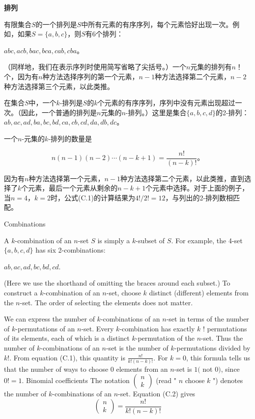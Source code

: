 \documentclass[lang=cn,newtx,10pt,scheme=chinese]{elegantbook}
\begin{document}
\textbf{排列}

有限集合$S$的一个排列是$S$中所有元素的有序序列，每个元素恰好出现一次。例如，如果$S=\{a,b,c\}$，则$S$有6个排列：

$a b c, a c b, b a c, b c a, c a b, c b a$。

（同样地，我们在表示序列时使用简写省略了尖括号。）一个$n$元集的排列有$n$！个，因为有$n$种方法选择序列的第一个元素，$n-1$种方法选择第二个元素，$n-2$种方法选择第三个元素，以此类推。

在集合$S$中，一个$k$-排列是$S$的$k$个元素的有序序列，序列中没有元素出现超过一次。（因此，一个普通的排列是$n$元集的$n$-排列。）这里是集合$\{a,b,c,d\}$的2-排列：$a b, a c, a d, b a, b c, b d, c a, c b, c d, d a, d b, d c$。

一个$n$-元集的$k$-排列的数量是

$$
n(n-1)(n-2) \cdots(n-k+1)=\frac{n !}{(n-k) !} \text {。}
$$

因为有$n$种方法选择第一个元素，$n-1$种方法选择第二个元素，以此类推，直到选择了$k$个元素，最后一个元素从剩余的$n-k+1$个元素中选择。对于上面的例子，当$n=4$，$k=2$时，公式(C.1)的计算结果为$4 ! / 2 !=12$，与列出的2-排列数相匹配。

Combinations

A $k$-combination of an $n$-set $S$ is simply a $k$-subset of $S$. For example, the 4-set $\{a, b, c, d\}$ has six 2-combinations:

$a b, a c, a d, b c, b d, c d$.

(Here we use the shorthand of omitting the braces around each subset.) To construct a $k$-combination of an $n$-set, choose $k$ distinct (different) elements from the $n$-set. The order of selecting the elements does not matter.

We can express the number of $k$-combinations of an $n$-set in terms of the number of $k$-permutations of an $n$-set. Every $k$-combination has exactly $k$ ! permutations of its elements, each of which is a distinct $k$-permutation of the $n$-set. Thus the number of $k$-combinations of an $n$-set is the number of $k$-permutations divided by $k !$. From equation (C.1), this quantity is
$\frac{n !}{k !(n-k) !}$.
For $k=0$, this formula tells us that the number of ways to choose 0 elements from an $n$-set is $1($ not 0$)$, since $0 !=1$.
Binomial coefficients
The notation $\left(\begin{array}{l}n \\ k\end{array}\right)$ (read " $n$ choose $k$ ") denotes the number of $k$-combinations of an $n$-set. Equation (C.2) gives
$$
\left(\begin{array}{l}
n \\
k
\end{array}\right)=\frac{n !}{k !(n-k) !}
$$
\end{document}

